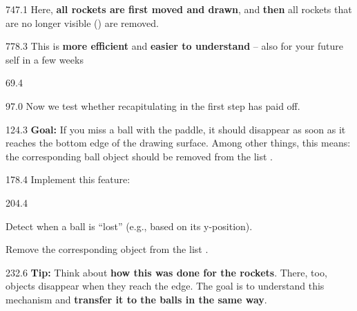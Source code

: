 \documentclass{aslab}
\begin{document}
\begin{region}[pitch=13.6]{747.1}
Here, \textbf{all rockets are first moved and drawn}, and \textbf{then} all
rockets that are no longer visible () are removed.
\end{region}

\begin{region}{778.3}
This is \textbf{more efficient} and \textbf{easier to understand} -- also for
your future self in a few weeks 
\end{region}

\nextpage
\begin{region}{69.4}
\end{region}

\begin{region}{97.0}
Now we test whether recapitulating in the first step has paid off.
\end{region}

\begin{region}[pitch=13.4]{124.3}
\textbf{Goal:} If you miss a ball with the paddle, it should disappear as soon
as it reaches the bottom edge of the drawing surface. Among other things, this
means: the corresponding ball object should be removed from the list
.
\end{region}

\begin{region}[pitch=13.4]{178.4}
Implement this feature:
\end{region}

\begin{region}[pitch=13.4]{204.4}
\begin{dashlist}
\item Detect when a ball is ``lost'' (e.g., based on its y-position).
\item Remove the corresponding object from the list .
\end{dashlist}
\end{region}

\begin{region}[pitch=14.25]{232.6}
\textbf{Tip:} Think about \textbf{how this was done for the rockets}. There,
too, objects disappear when they reach the edge. The goal is to understand
this mechanism and \textbf{transfer it to the balls in the same way}.
\end{region}
\end{document}
